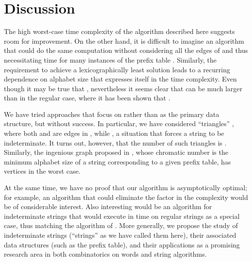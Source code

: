 \documentclass[runningheads,a4paper]{llncs}
\begin{document}
\section{Discussion}
\label{sect-future}
The high worst-case time complexity of the algorithm described here
suggests room for improvement. On the other hand, it is difficult to imagine an algorithm
that could do the same computation without considering all the edges
of  and thus necessitating  time for many instances of
the prefix table .
Similarly, the requirement to achieve a lexicographically least solution
leads to a recurring dependence on alphabet size 
that expresses itself in the time complexity.
Even though it may be true that ,
nevertheless it seems clear that  can be much larger
than in the regular case, where it has been shown \cite{CCR09,CRSW13}
that .

We have tried approaches that focus on  rather than 
as the primary data structure, but without success.
In particular, we have considered ``triangles'' ,
where both  and  are edges in ,
while , a situation that forces a
string to be indeterminate.
It turns out, however, that the number of such triangles is .
Similarly, the ingenious graph proposed in \cite{BBD14}, 
whose chromatic number is the minimum alphabet size 
of a string corresponding to a given prefix table,
has  vertices in the worst case. 

At the same time, we have no proof that our algorithm
is asymptotically optimal; for example, an algorithm that could eliminate
the  factor in the complexity would be of considerable interest.
Also interesting would be an algorithm for indeterminate strings that would
execute in  time on regular strings as a special case, thus matching the algorithm of \cite{CCR09}.
More generally, we propose the study of indeterminate strings
(``strings'' as we have called them here),
their associated data structures (such as the prefix table),
and their applications as a promising research area
in both combinatorics on words and string algorithms.

 

 
\end{document}
